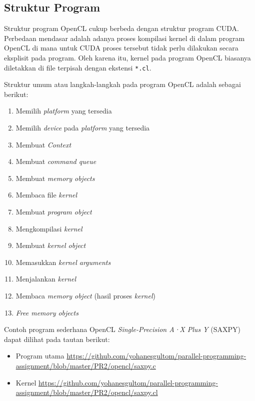 \subsection{Struktur Program}

Struktur program OpenCL cukup berbeda dengan struktur program CUDA. Perbedaan mendasar adalah adanya proses kompilasi kernel di dalam program OpenCL di mana untuk CUDA proses tersebut tidak perlu dilakukan secara eksplisit pada program. Oleh karena itu, kernel pada program OpenCL biasanya diletakkan di file terpisah dengan ekstensi \verb|*.cl|.

Struktur umum atau langkah-langkah pada program OpenCL adalah sebagai berikut:

\begin{enumerate}
		\item Memilih \textit{platform} yang tersedia
		\item Memilih \textit{device} pada \textit{platform} yang tersedia
		\item Membuat \textit{Context} ​
		\item Membuat \textit{command queue}
		\item Membuat \textit{memory objects} ​
		\item Membaca file \textit{kernel}
		\item Membuat \textit{program object}
		\item Mengkompilasi \textit{kernel}
		\item Membuat \textit{kernel object}
		\item Memasukkan \textit{kernel arguments}
		\item Menjalankan \textit{kernel}
		\item Membaca \textit{memory object} (hasil proses \textit{kernel})
		\item \textit{Free memory objects}
\end{enumerate}

Contoh program sederhana OpenCL \textit{Single-Precision A·X Plus Y} (SAXPY) dapat dilihat pada tautan berikut:

\begin{itemize}
	\item Program utama \url{https://github.com/yohanesgultom/parallel-programming-assignment/blob/master/PR2/opencl/saxpy.c}
	\item Kernel \url{https://github.com/yohanesgultom/parallel-programming-assignment/blob/master/PR2/opencl/saxpy.cl}
\end{itemize}